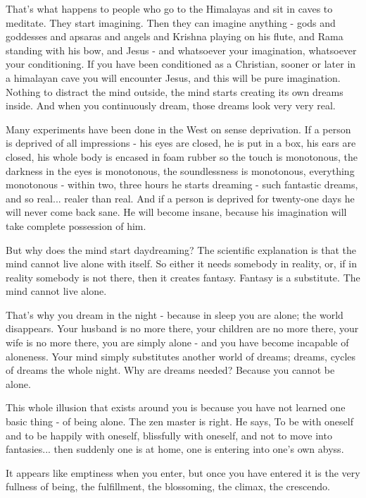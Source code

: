 That's what happens to people who go to the Himalayas and sit in caves to meditate. They start imagining. Then they can imagine anything - gods and goddesses and apsaras and angels and Krishna playing on his flute, and Rama standing with his bow, and Jesus - and whatsoever your imagination, whatsoever your conditioning. If you have been conditioned as a Christian, sooner or later in a himalayan cave you will encounter Jesus, and this will be pure imagination. Nothing to distract the mind outside, the mind starts creating its own dreams inside. And when you continuously dream, those dreams look very very real.

Many experiments have been done in the West on sense deprivation. If a person is deprived of all impressions - his eyes are closed, he is put in a box, his ears are closed, his whole body is encased in foam rubber so the touch is monotonous, the darkness in the eyes is monotonous, the soundlessness is monotonous, everything monotonous - within two, three hours he starts dreaming - such fantastic dreams, and so real... realer than real. And if a person is deprived for twenty-one days he will never come back sane. He will become insane, because his imagination will take complete possession of him.

But why does the mind start daydreaming? The scientific explanation is that the mind cannot live alone with itself. So either it needs somebody in reality, or, if in reality somebody is not there, then it creates fantasy. Fantasy is a substitute. The mind cannot live alone.

That's why you dream in the night - because in sleep you are alone; the world disappears. Your husband is no more there, your children are no more there, your wife is no more there, you are simply alone - and you have become incapable of aloneness. Your mind simply substitutes another world of dreams; dreams, cycles of dreams the whole night. Why are dreams needed? Because you cannot be alone.

This whole illusion that exists around you is because you have not learned one basic thing - of being alone. The zen master is right. He says,  To be with oneself and to be happily with oneself, blissfully with oneself, and not to move into fantasies... then suddenly one is at home, one is entering into one's own abyss.

It appears like emptiness when you enter, but once you have entered it is the very fullness of being, the fulfillment, the blossoming, the climax, the crescendo.

